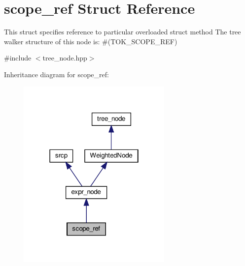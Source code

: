 \hypertarget{structscope__ref}{}\section{scope\+\_\+ref Struct Reference}
\label{structscope__ref}


This struct specifies reference to particular overloaded struct method The tree walker structure of this node is\+: \#(T\+O\+K\+\_\+\+S\+C\+O\+P\+E\+\_\+\+R\+EF)  




{\ttfamily \#include $<$tree\+\_\+node.\+hpp$>$}



Inheritance diagram for scope\+\_\+ref\+:
\nopagebreak
\begin{figure}[H]
\begin{center}
\leavevmode
\includegraphics[width=214pt]{d1/d1d/structscope__ref__inherit__graph}
\end{center}
\end{figure}


